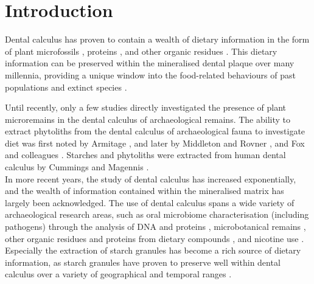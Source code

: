 \documentclass[utf8]{../templates/frontiersSCNS}
\begin{document}
\section{Introduction}\label{introduction}

Dental calculus has proven to contain a wealth of
dietary information in the form of plant microfossils
\citep{henryCalculusSyria2008, hardyStarchGranules2009},
proteins \citep{hendyProteomicCalculus2018, warinnerEvidenceMilk2014},
and other organic residues \citep{buckleyDentalCalculus2014}.
This dietary information can be preserved within the mineralised dental plaque
over many millennia, providing a unique window into the food-related behaviours of
past populations
\citep{henryCalculusSyria2008, jovanovicNeolithicCalculus2021, taoWheatCalculus2020}
and extinct species \citep{henryNeanderthalCalculus2014, hardyNeanderthalMedics2012}.

Until recently, only a few studies directly investigated the presence of plant
microremains
in the dental calculus of archaeological remains. The ability to extract phytoliths
from the dental calculus of archaeological fauna to investigate diet was first
noted by Armitage \citeyearpar{armitageExtractionIdentification1975},
and later by Middleton and Rovner \citeyearpar{middletonOpalPhytoliths1994},
and Fox and colleagues \citeyearpar{foxPhytolithCalculus1996}. Starches and phytoliths were
extracted from human dental calculus by Cummings and Magennis \citeyearpar{cummingsMayanCalculus1997}.\\
In more recent years, the study of dental calculus has increased exponentially,
and the wealth of information contained within the mineralised matrix has largely
been acknowledged. The use of dental calculus spans a wide
variety of archaeological research areas, such as oral microbiome
characterisation (including pathogens) through the analysis of DNA and proteins
\citep{adlerSequencingAncient2013, warinnerPathogensHost2014},
microbotanical remains \citep{henryCalculusSyria2008, hardyStarchGranules2009, mickleburghNewInsights2012},
other organic residues and proteins from dietary compounds
\citep{buckleyDentalCalculus2014, hendyProteomicCalculus2018},
and nicotine use \citep{eerkensDentalCalculus2018}. Especially the extraction
of starch granules has become a rich source of dietary
information, as starch granules have proven to preserve well within dental calculus
over a variety of geographical and temporal ranges
\citep{pipernoStarchGrains2008, henryNeanderthalCalculus2014, taoWheatCalculus2020, jovanovicNeolithicCalculus2021}.
\end{document}
